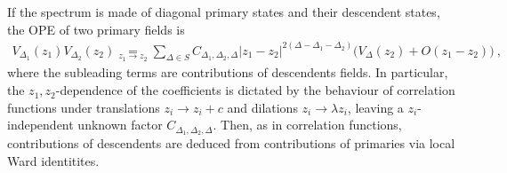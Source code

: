 \documentclass[12pt, a4paper]{article}
\theoremstyle{break}
\begin{document}
If
the spectrum is made of diagonal primary states and their descendent states, the OPE of two primary fields is
\begin{align}
 V_{\Delta_1}(z_1) V_{\Delta_2}(z_2) 
\underset{z_1\to z_2}{=} \sum_{\Delta\in S} C_{\Delta_1,\Delta_2,\Delta} |z_1-z_2|^{2(\Delta-\Delta_1-\Delta_2)}
 \Big(V_{\Delta}(z_2) + O(z_1-z_2) \Big)\ ,
 \label{eq:ope}
\end{align}
where the subleading terms are contributions of descendents fields. 
In particular, the $z_1,z_2$-dependence of the coefficients is dictated by the behaviour
of correlation functions under translations $z_i\to z_i+c$ and dilations $z_i\to\lambda z_i$, leaving a $z_i$-independent unknown factor $C_{\Delta_1,\Delta_2,\Delta}$.
Then, as in correlation functions, contributions of descendents are deduced from contributions of primaries via local Ward identitites.
\end{document}
